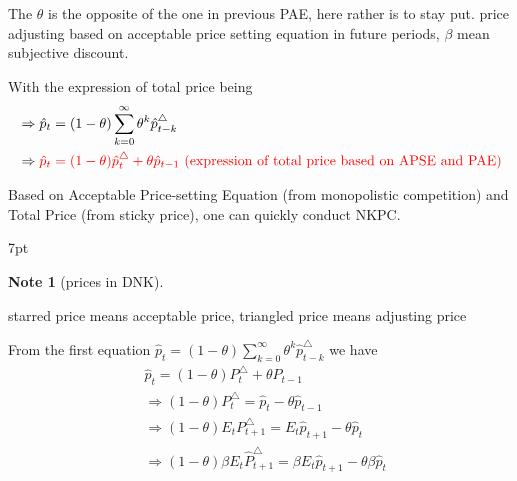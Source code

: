 \documentclass{article}
\newenvironment{blueblock}{
\def\FrameCommand{
  \hspace{1pt}
    {\color{DarkBlue}
    \vrule width 2pt}
    {\color{blueshade}
    \vrule width 4pt}
  \colorbox{blueshade}
}
\MakeFramed{
  \advance
  \hsize-
  \width
  \FrameRestore}
\noindent\hspace{-4.55pt}%
\begin{adjustwidth}{}{7pt}
\vspace{2pt}\vspace{2pt}
}
{\vspace{2pt}\end{adjustwidth}\endMakeFramed}
\newtheorem{note}{Note}
\begin{document}
The $\theta$ is the opposite of the one in previous PAE, here rather is to stay put. price adjusting based on acceptable price setting equation in future periods, $\beta$ mean subjective discount.

With the expression of total price being
\begin{align}
&\Rightarrow\hat p_t=(1-\theta) \sum\limits_{k=0}^\infty \theta^k \hat p_{t-k}^\triangle
\\&\Rightarrow \color{red} \hat p_t=(1-\theta)\hat p_t^\triangle +\theta \hat p_{t-1} \text{ (expression of total price based on APSE and PAE)}
\end{align}

Based on Acceptable Price-setting Equation (from monopolistic competition) and Total Price (from sticky price), one can quickly conduct NKPC.

\begin{blueblock}
\begin{note}[prices in DNK]
\end{note}
starred price means acceptable price, triangled price means adjusting price
\end{blueblock}


From the first equation $\hat p_t=(1-\theta) \sum\limits_{k=0}^\infty \theta^k \hat p_{t-k}^\triangle$ we have
\begin{align}
& \hat p_t =(1-\theta)P_t^\triangle+\theta P_{t-1}
\\& \Rightarrow (1-\theta)P_t^\triangle=\hat p_t - \theta \hat p_{t-1}
\\& \Rightarrow (1-\theta)E_t P_{t+1}^\triangle=E_t \hat p_{t+1} - \theta \hat p_t
\\& \Rightarrow (1-\theta)\beta E_t \hat P_{t+1}^\triangle=\beta E_t \hat p_{t+1} - \theta \beta \hat p_t
\end{align}
\end{document}
